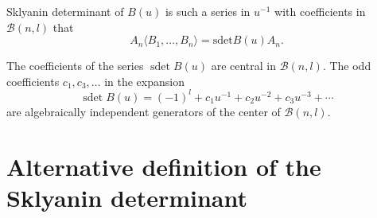 \documentclass[pdftex]{sigma}
\newcommand{\B}{\mathcal B}
\begin{document}
\begin{definition} Sklyanin determinant of $B(u)$ is such a  series in $u^{-1}$   with coef\/f\/icients in $\B(n,l)$ that
\[
 A_n \langle B_1,\dots, B_n\rangle =\text{sdet} B(u)A_n.
 \]
 \end{definition}
\begin{proposition}[\cite {MR}]\label{MR} The coefficients of the series $\operatorname{sdet}B(u)$ are  central in $\B(n,l)$. The odd coefficients $c_1,c_3,\dots$ in the expansion
\[
\operatorname{sdet} B(u)=(-1)^l+c_1u^{-1}+c_2u^{-2}+c_3u^{-3}+\cdots
\]
 are algebraically independent generators of the center of  $\B(n,l)$.
 \end{proposition}

\section{Alternative def\/inition of  the Sklyanin determinant}\label{section2}
\end{document}

